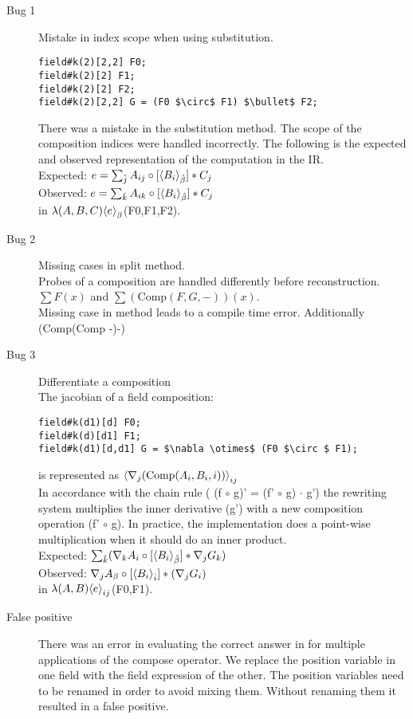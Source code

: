 \documentclass{article}
\begin{document}
\begin{description}
\item[Bug 1] Mistake in index scope when using substitution.
\begin{lstlisting}
field#k(2)[2,2] F0;
field#k(2)[2] F1;
field#k(2)[2] F2;
field#k(2)[2,2] G = (F0 $\circ$ F1) $\bullet$ F2;
\end{lstlisting}

There was a mistake in the substitution method.
The scope of the composition indices were handled incorrectly.
The following is the expected and observed representation of the computation in the \name{} IR.\\
Expected: $e=\sum_{\hat{j}} {A_{ij}}\circ [{\left\langle{B_i}\right\rangle}_{\hat{\beta}}] *C_j $\\
Observed: $e=\sum_{\hat{k}} {A_{ik}}\circ [{\left\langle{B_i}\right\rangle}_{\hat{\beta}}] *C_j$\\
in $\lambda(A,B,C){\left\langle{e}\right\rangle}_{\beta}$(F0,F1,F2). 
\item[Bug 2] Missing cases in split method.\\
Probes of a composition are handled differently before reconstruction.\\
$\sum F(x)$ and $\sum (\text{Comp} (F,G,-))(x)$.\\
Missing case in method leads to a compile time error.
Additionally (Comp(Comp -)-)
\item[Bug 3]  Differentiate a composition\\
The jacobian of a field composition:
\begin{lstlisting}
field#k(d1)[d] F0;
field#k(d)[d1] F1;
field#k(d1)[d,d1] G = $\nabla \otimes$ (F0 $\circ $ F1);
\end{lstlisting}
is represented as ${\left\langle{\nabla_j (\text{Comp}(A_i,B_i,i))}\right\rangle}_{ij}$\\
In accordance with the chain rule ( (f $\circ $ g)' = (f'  $\circ $ g) $\cdot$ g') the rewriting system multiplies the inner derivative (g') with a new composition operation (f'  $\circ $ g).
In practice, the implementation does a point-wise multiplication when it should do an inner product.\\
 Expected: $\sum_{\hat{k}} ({\nabla_k A_i}\circ [{\left\langle{B_i}\right\rangle}_{\hat{\beta}}] * \nabla_j G_k) $\\
Observed: ${\nabla_j  A_{\beta}}\circ [{\left\langle{B_i}\right\rangle}_{\hat{ i}}] * (\nabla_j G_i)$\\
in $\lambda(A,B){\left\langle{e}\right\rangle}_{ij}$(F0,F1). 
\item[False positive]
There was an error in evaluating the correct answer in \checkname{} for multiple applications of the compose operator.
We replace the position variable in one field with the field expression of the other.
The position variables need to be renamed in order to avoid mixing them.
Without renaming them it resulted in a false positive. 


\end{description}
\end{document}
